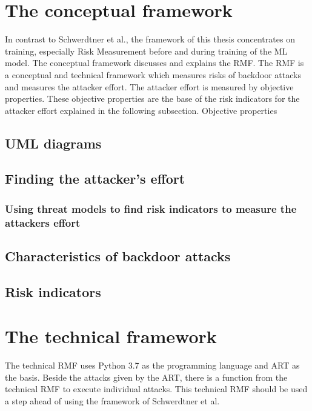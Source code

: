\section{The conceptual framework}
\label{sec:conFrame}

In contrast to Schwerdtner et al., the framework of this thesis concentrates on training, especially Risk Measurement before and during training of the ML model.
The conceptual framework discusses and explains the RMF. The RMF is a conceptual and technical framework which measures risks of backdoor attacks and measures the attacker effort. The attacker effort
is measured by objective properties. These objective properties are the base of the risk indicators for the attacker effort explained in the following subsection. Objective properties

\subsection{UML diagrams}


\subsection{Finding the attacker's effort}

\subsubsection*{Using threat models to find risk indicators to measure the attackers effort}



\subsection{Characteristics of backdoor attacks}

\subsection{Risk indicators}
\label{sec:risk_indicators}

\newpage

\section{The technical framework}
\label{sec:techFrame}

The technical RMF uses Python 3.7 as the programming language and ART as the basis. Beside the attacks given by the ART, there is a function from the technical RMF to execute individual attacks. This technical RMF should be used a step ahead of using the framework of Schwerdtner et al.


